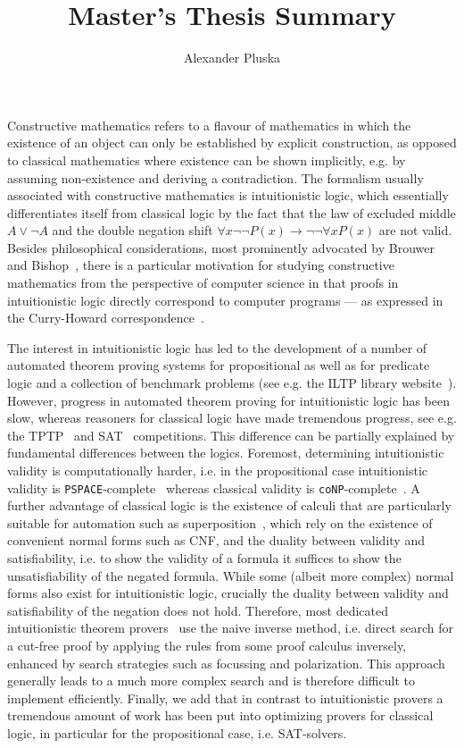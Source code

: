 \documentclass{article}
\title{Master's Thesis Summary}
\author{Alexander Pluska}
\begin{document}
	\maketitle
	
	Constructive mathematics refers to a flavour of mathematics in which the existence of an object can only be established by explicit construction, as opposed to classical mathematics where existence can be shown implicitly, e.g. by assuming non-existence and deriving a contradiction.
	The formalism usually associated with constructive mathematics is intuitionistic logic, which essentially differentiates itself from classical logic by the fact that the law of excluded middle $A\vee\neg A$ and the double negation shift $\forall x\neg\neg P(x)\to\neg\neg\forall xP(x)$ are not valid.
	Besides philosophical considerations, most prominently advocated by Brouwer~\cite{brouwer1907over} and Bishop~\cite{bishop1967foundations}, there is a particular motivation for studying constructive mathematics from the perspective of computer science in that proofs in  intuitionistic logic directly correspond to computer programs --- as expressed in the Curry-Howard correspondence~\cite{howard1980formulae}.
	
	The interest in intuitionistic logic has led to the development of a number of automated theorem proving systems for propositional as well as for predicate logic and a collection of benchmark problems (see e.g. the
	ILTP library website~\cite{iltp}).
	However, progress in automated theorem proving for intuitionistic logic has been slow, whereas reasoners for classical logic have made tremendous progress, see e.g. the TPTP~\cite{casc} and SAT~\cite{satc} competitions.
	This difference can be partially explained by fundamental differences between the logics.
	Foremost, determining intuitionistic validity is computationally harder, i.e. in the propositional case intuitionistic validity is \verb+PSPACE+-complete~\cite{statman1979intuitionistic} whereas classical validity is \verb+coNP+-complete~\cite{cook1971complexity}.
	A further advantage of classical logic is the existence of calculi that are particularly suitable for automation such as superposition~\cite{bachmair2001resolution}, which rely on the existence of convenient normal forms such as CNF, and the duality between validity and satisfiability, i.e. to show the validity of a formula it suffices to show the unsatisfiability of the negated formula.
	While some (albeit more complex) normal forms also exist  for intuitionistic logic, crucially the duality between validity and satisfiability of the negation does not hold.
	Therefore, most dedicated intuitionistic theorem provers~\cite{mclaughlin2009efficient, tammet1996resolution} use the naive inverse method, i.e. direct search for a cut-free proof by applying the rules from some proof calculus inversely, enhanced by search strategies such as focussing and polarization. This approach generally leads to a much more complex search and is therefore difficult to implement efficiently.
	Finally, we add that in contrast to intuitionistic provers a tremendous amount of work has been put into optimizing provers for classical logic, in particular for the propositional case, i.e. SAT-solvers.
	
\end{document}
